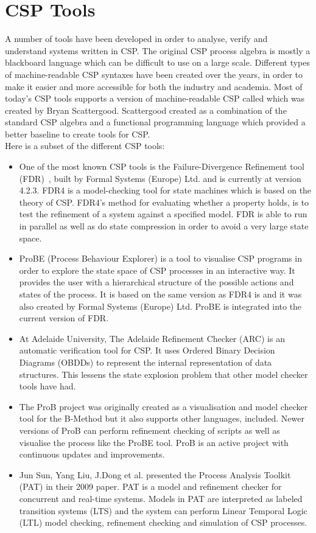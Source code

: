 \section{CSP Tools}
A number of tools have been developed in order to analyse, verify and understand systems written in CSP. The original CSP process algebra is mostly a blackboard language which can be difficult to use on a large scale. Different types of machine-readable CSP syntaxes have been created over the years, in order to make it easier and more accessible for both the industry and academia. Most of today's CSP tools supports a version of machine-readable CSP called \cspm{} which was created by Bryan Scattergood\cite{Scattergood1998}. Scattergood created \cspm{} as a combination of the standard CSP algebra and a functional programming language which provided a better baseline to create tools for CSP.\\
Here is a subset of the different CSP tools:
\begin{itemize}
\item One of the most known CSP tools is the Failure-Divergence Refinement tool (FDR)~\cite{fdr}, built by Formal Systems (Europe) Ltd. and is currently at version 4.2.3. FDR4 is a model-checking tool for state machines which is based on the theory of CSP. FDR4's method for evaluating whether a property holds, is to test the refinement of a system against a specified model.
FDR is able to run in parallel as well as do state compression in order to avoid a very large state space.
\item ProBE (Process Behaviour Explorer)\cite{probe} is a tool to visualise CSP programs in order to explore the state space of CSP processes in an interactive way. It provides the user with a hierarchical structure of the possible actions and states of the process. It is based on the same \cspm{} version as FDR4 is and it was also created by Formal Systems (Europe) Ltd. ProBE is integrated into the current version of FDR.
\item At Adelaide University, The Adelaide Refinement Checker (ARC)\cite{Parashkevov1996} is an automatic verification tool for CSP. It uses Ordered Binary Decision Diagrams (OBDDs) to represent the internal representation of data structures. This lessens the state explosion problem that other model checker tools have had.
\item The ProB project\cite{ProB}\cite{Leuschel2003} was originally created as a visualisation and model checker tool for the B-Method\cite{abrial2005b} but it also supports other languages, \cspm{} included. Newer versions of ProB can perform refinement checking of \cspm{} scripts as well as visualise the process like the ProBE tool. ProB is an active project with continuous updates and improvements.
\item Jun Sun, Yang Liu, J.Dong et al. presented the Process Analysis Toolkit (PAT) in their 2009 paper\cite{Sun2009}. PAT is a model and refinement checker for concurrent and real-time systems. Models in PAT are interpreted as labeled transition systems (LTS) and the system can perform Linear Temporal Logic (LTL) model checking, refinement checking and simulation of CSP processes.
\end{itemize}

